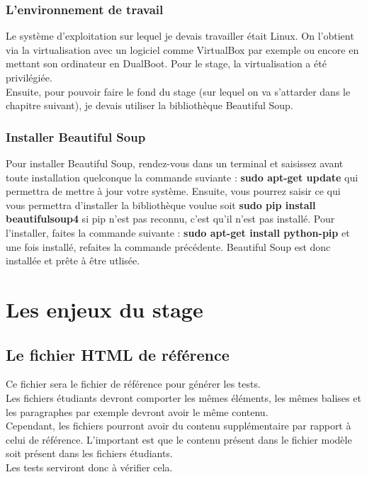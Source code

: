 \documentclass[12pt,twoside]{book}
\begin{document}
\subsection{L'environnement de travail}
Le système d'exploitation sur lequel je devais travailler était Linux. On l'obtient via la virtualisation avec un logiciel comme VirtualBox par exemple ou encore en mettant son ordinateur en DualBoot. Pour le stage, la virtualisation a été privilégiée.\\
Ensuite, pour pouvoir faire le fond du stage (sur lequel on va s'attarder dans le chapitre suivant), je devais utiliser la bibliothèque Beautiful Soup.
\subsection{Installer Beautiful Soup}
Pour installer Beautiful Soup, rendez-vous dans un terminal et saisissez avant toute installation quelconque la commande suviante : \textbf{sudo apt-get update} qui permettra de mettre à jour votre système. Ensuite, vous pourrez saisir ce qui vous permettra d'installer la bibliothèque voulue soit \textbf{sudo pip install beautifulsoup4} si pip n'est pas reconnu, c'est qu'il n'est pas installé. Pour l'installer, faites la commande suivante : \textbf{sudo apt-get install python-pip} et une fois installé, refaites la commande précédente. Beautiful Soup est donc installée et prête à être utlisée.

\color{red}
\chapter{Les enjeux du stage}
\color{black}
\section{Le fichier HTML de référence}

Ce fichier sera le fichier de référence pour générer les tests.\\ Les fichiers étudiants devront comporter les mêmes éléments, les mêmes balises et les paragraphes par exemple devront avoir le même contenu.\\ 
Cependant, les fichiers pourront avoir du contenu supplémentaire par rapport à celui de référence. L'important est que le contenu présent dans le fichier modèle soit présent dans les fichiers étudiants. \\
Les tests serviront donc à vérifier cela. 
\newpage
\end{document}
